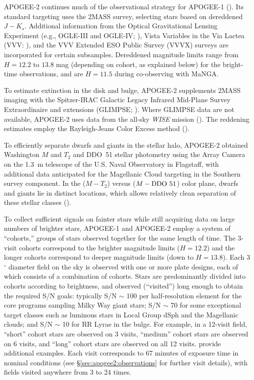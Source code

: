 APOGEE-2 continues much of the observational strategy for APOGEE-1
(\citealt{zasowski13a}).  Its standard targeting uses the 2MASS
survey, selecting stars based on dereddened $J-K_s$.  Additional
information from the Optical Gravitational Lensing Experiment (e.g.,
OGLE-III and OGLE-IV; \citealt{udalski08a, udalski15a}), Vista
Variables in the Via Lactea (VVV: \citealt{minniti10a, saito12a,
  hempel14a}), and the VVV Extended ESO Public Survey (VVVX) surveys
are incorporated for certain subsamples. Dereddened magnitude limits
range from $H=12.2$ to $13.8$ mag (depending on cohort, as explained
below) for the bright-time observations, and are $H=11.5$ during
co-observing with MaNGA.

To estimate extinction in the disk and bulge, APOGEE-2 supplements
2MASS imaging with the Spitzer-IRAC Galactic Legacy Infrared Mid-Plane
Survey Extraordinaire and extensions (GLIMPSE; \citealt{benjamin03a,
  churchwell09a}).  Where GLIMPSE data are not available, APOGEE-2
uses data from the all-sky {\it WISE}
mission (\citealt{wright10a}).  The reddening estimates employ the
Rayleigh-Jeans Color Excess method (\citealt{zasowski09a,
  majewski11a}).

To efficiently separate dwarfs and giants in the stellar halo,
APOGEE-2 obtained Washington $M$ and $T_2$ and DDO~51 stellar
photometry using the Array Camera on the 1.3~m telescope of the
U.S. Naval Observatory in Flagstaff, with additional data anticipated
for the Magellanic Cloud targeting in the Southern survey
component. In the ($M-T_2$) versus ($M-{\rm DDO~51}$) color plane, dwarfs
and giants lie in distinct locations, which allows relatively clean
separation of these stellar classes (\citealt{geisler84b, munoz05a,
  zasowski13a}).

To collect sufficient signals on fainter stars while still acquiring
data on large numbers of brighter stars, APOGEE-1 and APOGEE-2 employ
a system of ``cohorts,'' groups of stars observed together for the
same length of time.  The 3-visit cohorts correspond to the brighter
magnitude limits ($H=12.2$) and the longer cohorts correspond to
deeper magnitude limits (down to $H=13.8$). Each 3$^\circ$ diameter
field on the sky is observed with one or more plate designs, each of
which consists of a combination of cohorts.  Stars are predominantly
divided into cohorts according to brightness, and observed
(``visited'') long enough to obtain the required S/N goals: typically
S/N $\sim$ 100 per half-resolution element for the core programs
sampling Milky Way giant stars; S/N $\sim$ 70 for some exceptional
target classes such as luminous stars in Local Group dSph and the
Magellanic clouds; and S/N $\sim$ 10 for RR Lyrae in the bulge. For
example, in a 12-visit field, ``short'' cohort stars are observed on 3
visits, ``medium'' cohort stars are observed on 6 visits, and ``long''
cohort stars are observed on all 12 visits.  \citet{zasowski13a}
provide additional examples. Each visit corresponds to 67 minutes of
exposure time in nominal conditions (see
\S\ref{sec:apogee2:observations} for further visit details), with
fields visited anywhere from 3 to 24 times.

